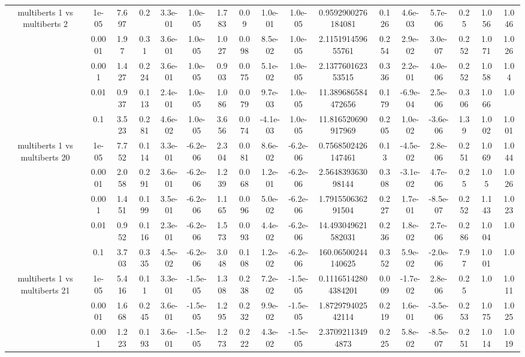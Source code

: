 \begin{tabular}{|c|c|c|c|c|c|c|c|c|c|c|c|c|c|c|c|c|}
\hline
\multirow{5}{*}{multiberts 1 vs multiberts 2} & 1e-05 & 7.697 & 0.2 & 3.3e-01 & 1.0e-05 & 1.783 & 0.09 & 1.0e-01 & 1.0e-05 & 0.9592900276184081 & 0.126 & 4.6e-03 & 5.7e-06 & 0.25 & 1.056 & 1.046 \\
 & 0.0001 & 1.97 & 0.31 & 3.6e-01 & 1.0e-05 & 1.027 & 0.098 & 8.5e-02 & 1.0e-05 & 2.115191459655761 & 0.254 & 2.9e-02 & 3.0e-07 & 0.252 & 1.071 & 1.026 \\
 & 0.001 & 1.427 & 0.224 & 3.6e-01 & 1.0e-05 & 0.903 & 0.075 & 5.1e-02 & 1.0e-05 & 2.137760162353515 & 0.336 & 2.2e-01 & 4.0e-06 & 0.252 & 1.058 & 1.04 \\
 & 0.01 & 0.937 & 0.113 & 2.4e-01 & 1.0e-05 & 1.086 & 0.079 & 9.7e-03 & 1.0e-05 & 11.389686584472656 & 0.179 & -6.9e-04 & 2.5e-06 & 0.306 & 1.066 & 1.0 \\
 & 0.1 & 3.523 & 0.281 & 4.6e-02 & 1.0e-05 & 3.656 & 0.074 & -4.1e-03 & 1.0e-05 & 11.816520690917969 & 0.205 & 1.0e-02 & -3.6e-06 & 1.39 & 1.002 & 1.001 \\
\hline
\multirow{5}{*}{multiberts 1 vs multiberts 20} & 1e-05 & 7.752 & 0.114 & 3.3e-01 & -6.2e-06 & 2.304 & 0.081 & 8.6e-02 & -6.2e-06 & 0.7568502426147461 & 0.13 & -4.5e-02 & 2.8e-06 & 0.251 & 1.069 & 1.044 \\
 & 0.0001 & 2.058 & 0.291 & 3.6e-01 & -6.2e-06 & 1.239 & 0.068 & 1.2e-01 & -6.2e-06 & 2.564839363098144 & 0.308 & -3.1e-02 & 4.7e-06 & 0.25 & 1.05 & 1.026 \\
 & 0.001 & 1.451 & 0.199 & 3.5e-01 & -6.2e-06 & 1.165 & 0.096 & 5.0e-02 & -6.2e-06 & 1.791550636291504 & 0.227 & 1.7e-01 & -8.5e-07 & 0.252 & 1.143 & 1.023 \\
 & 0.01 & 0.952 & 0.116 & 2.3e-01 & -6.2e-06 & 1.573 & 0.093 & 4.4e-02 & -6.2e-06 & 14.493049621582031 & 0.236 & 1.8e-02 & 2.7e-06 & 0.286 & 1.004 & 1.0 \\
 & 0.1 & 3.703 & 0.335 & 4.5e-02 & -6.2e-06 & 3.048 & 0.108 & 1.2e-02 & -6.2e-06 & 160.06500244140625 & 0.352 & 5.9e-02 & -2.0e-06 & 7.97 & 1.001 & 1.0 \\
\hline
\multirow{5}{*}{multiberts 1 vs multiberts 21} & 1e-05 & 5.416 & 0.11 & 3.3e-01 & -1.5e-05 & 1.308 & 0.238 & 7.2e-02 & -1.5e-05 & 0.11165142804384201 & 0.009 & -1.7e-02 & 2.8e-06 & 0.25 & 1.0 & 1.011 \\
 & 0.0001 & 1.668 & 0.245 & 3.6e-01 & -1.5e-05 & 1.295 & 0.232 & 9.9e-02 & -1.5e-05 & 1.872979402542114 & 0.219 & 1.6e-01 & -3.5e-06 & 0.253 & 1.075 & 1.025 \\
 & 0.001 & 1.223 & 0.193 & 3.6e-01 & -1.5e-05 & 1.273 & 0.222 & 4.3e-02 & -1.5e-05 & 2.37092113494873 & 0.225 & 5.8e-02 & -8.5e-07 & 0.251 & 1.014 & 1.019 \\

\end{tabular}
